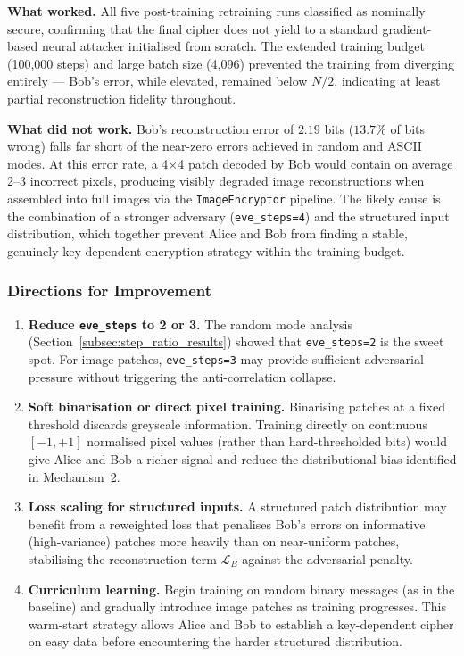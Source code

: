 \documentclass[12pt, a4paper]{article}
\newcommand{\code}[1]{\texttt{\color{CodeRed}#1}}
\begin{document}
\textbf{What worked.}
All five post-training retraining runs classified as nominally secure, confirming
that the final cipher does not yield to a standard gradient-based neural attacker
initialised from scratch. The extended training budget (100{,}000 steps) and
large batch size (4{,}096) prevented the training from diverging entirely ---
Bob's error, while elevated, remained below $N/2$, indicating at least partial
reconstruction fidelity throughout.

\textbf{What did not work.}
Bob's reconstruction error of $2.19$ bits ($13.7\%$ of bits wrong) falls far
short of the near-zero errors achieved in random and ASCII modes. At this error
rate, a 4$\times$4 patch decoded by Bob would contain on average 2--3 incorrect
pixels, producing visibly degraded image reconstructions when assembled into full
images via the \code{ImageEncryptor} pipeline. The likely cause is the combination
of a stronger adversary (\code{eve\_steps=4}) and the structured input distribution,
which together prevent Alice and Bob from finding a stable, genuinely key-dependent
encryption strategy within the training budget.

\subsubsection*{Directions for Improvement}

\begin{enumerate}[leftmargin=2em, itemsep=4pt]
	\item \textbf{Reduce \code{eve\_steps} to 2 or 3.} The random mode
	analysis (Section~\ref{subsec:step_ratio_results}) showed that
	\code{eve\_steps=2} is the sweet spot. For image patches,
	\code{eve\_steps=3} may provide sufficient adversarial pressure
	without triggering the anti-correlation collapse.
	\item \textbf{Soft binarisation or direct pixel training.} Binarising
	patches at a fixed threshold discards greyscale information. Training
	directly on continuous $[-1,+1]$ normalised pixel values
	(rather than hard-thresholded bits) would give Alice and Bob a richer
	signal and reduce the distributional bias identified in Mechanism~2.
	\item \textbf{Loss scaling for structured inputs.} A structured patch
	distribution may benefit from a reweighted loss that penalises Bob's
	errors on informative (high-variance) patches more heavily than on
	near-uniform patches, stabilising the reconstruction term
	$\mathcal{L}_B$ against the adversarial penalty.
	\item \textbf{Curriculum learning.} Begin training on random binary
	messages (as in the baseline) and gradually introduce image patches
	as training progresses. This warm-start strategy allows Alice and Bob
	to establish a key-dependent cipher on easy data before encountering
	the harder structured distribution.
\end{enumerate}
\end{document}
